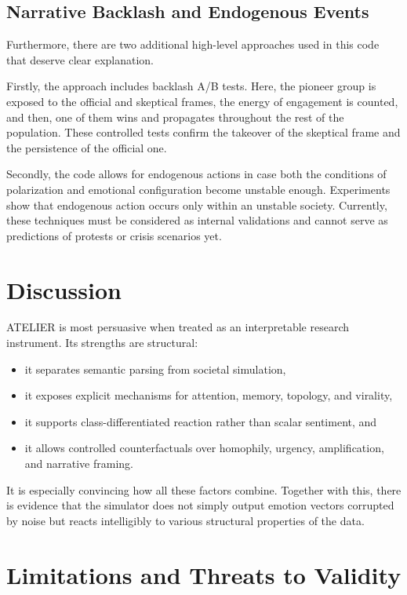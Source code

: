 \documentclass[12pt]{IEEEtran}
\begin{document}
\subsection{Narrative Backlash and Endogenous Events}

Furthermore, there are two additional high-level approaches used in this code that deserve clear explanation.

Firstly, the approach includes backlash A/B tests. Here, the pioneer group is exposed to the official and skeptical frames, the energy of engagement is counted, and then, one of them wins and propagates throughout the rest of the population. These controlled tests confirm the takeover of the skeptical frame and the persistence of the official one.

Secondly, the code allows for endogenous actions in case both the conditions of polarization and emotional configuration become unstable enough. Experiments show that endogenous action occurs only within an unstable society. Currently, these techniques must be considered as internal validations and cannot serve as predictions of protests or crisis scenarios yet.
\section{Discussion}
\label{sec:discussion}

ATELIER is most persuasive when treated as an interpretable research instrument. Its strengths are structural:

\begin{itemize}
    \item it separates semantic parsing from societal simulation,
    \item it exposes explicit mechanisms for attention, memory, topology, and virality,
    \item it supports class-differentiated reaction rather than scalar sentiment, and
    \item it allows controlled counterfactuals over homophily, urgency, amplification, and narrative framing.
\end{itemize}

It is especially convincing how all these factors combine. Together with this, there is evidence that the simulator does not simply output emotion vectors corrupted by noise but reacts intelligibly to various structural properties of the data.

\section{Limitations and Threats to Validity}
\label{sec:limitations}
\end{document}
